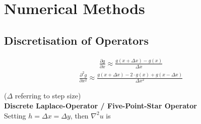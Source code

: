 \section{Numerical Methods}
\subsection{Discretisation of Operators}
\begin{align*}
	\frac{\partial g}{\partial x}
	\approx
	\frac{g(x + \Delta x) - g(x)}{\Delta x}
\end{align*}
\begin{align*}
	\frac{\partial^2 g}{\partial x^2}
	\approx
	\frac{g(x + \Delta x) - 2\cdot g(x) + g(x - \Delta x)}{\Delta x^2}
\end{align*}

($\Delta$ referring to step size)
\\[1em]
\textbf{Discrete Laplace-Operator / Five-Point-Star Operator}
\\
Setting $h = \Delta x = \Delta y$, then $\nabla^2u$ is
